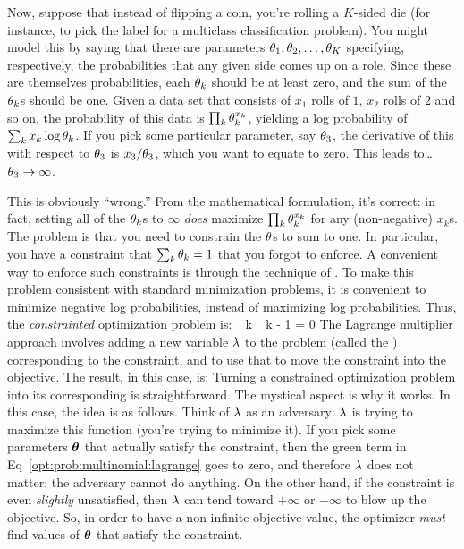 Now, suppose that instead of flipping a coin, you're rolling a
$K$-sided die (for instance, to pick the label for a multiclass
classification problem).  You might model this by saying that there
are parameters $\theta_1, \theta_2, \dots, \theta_K$ specifying, respectively,
the probabilities that any given side comes up on a role.  Since these
are themselves probabilities, each $\theta_k$ should be at least zero,
and the sum of the $\theta_k$s should be one.  Given a data set that
consists of $x_1$ rolls of $1$, $x_2$ rolls of $2$ and so on, the
probability of this data is $\prod_k \theta_k^{x_k}$, yielding a log
probability of $\sum_k x_k \log \theta_k$.  If you pick some particular
parameter, say $\theta_3$, the derivative of this with respect to $\theta_3$
is $x_3 / \theta_3$, which you want to equate to zero.  This leads
to\dots $\theta_3 \rightarrow \infty$.

This is obviously ``wrong.''  From the mathematical formulation, it's
correct: in fact, setting all of the $\theta_k$s to $\infty$ \emph{does}
maximize $\prod_k \theta_k^{x_k}$ for any (non-negative) $x_k$s.  The
problem is that you need to constrain the $\theta$s to sum to one.  In
particular, you have a constraint that $\sum_k \theta_k = 1$ that you
forgot to enforce.  A convenient way to enforce such constraints is
through the technique of .  To make this
problem consistent with standard minimization problems, it is
convenient to minimize negative log probabilities, instead of
maximizing log probabilities.  Thus, the \emph{constrainted}
optimization problem is:
%
%
{\textcolor{darkergreen}{\sum_k \th_k - 1 = 0}}
%
The Lagrange multiplier approach involves adding a new variable $\lambda$
to the problem (called the ) corresponding
to the constraint, and to use that to move the constraint into the
objective.  The result, in this case, is:
%
%
Turning a constrained optimization problem into its corresponding
 is straightforward.  The mystical aspect is why
it works.  In this case, the idea is as follows.  Think of $\lambda$ as an
adversary: $\lambda$ is trying to maximize this function (you're trying to
minimize it).  If you pick some parameters $\boldsymbol{\theta}$ that actually
satisfy the constraint, then the green term in
Eq~\eqref{opt:prob:multinomial:lagrange} goes to zero, and therefore
$\lambda$ does not matter: the adversary cannot do anything.  On the other
hand, if the constraint is even \emph{slightly} unsatisfied, then
$\lambda$ can tend toward $+\infty$ or $-\infty$ to blow up the objective.
So, in order to have a non-infinite objective value, the optimizer
\emph{must} find values of $\boldsymbol{\theta}$ that satisfy the constraint.

